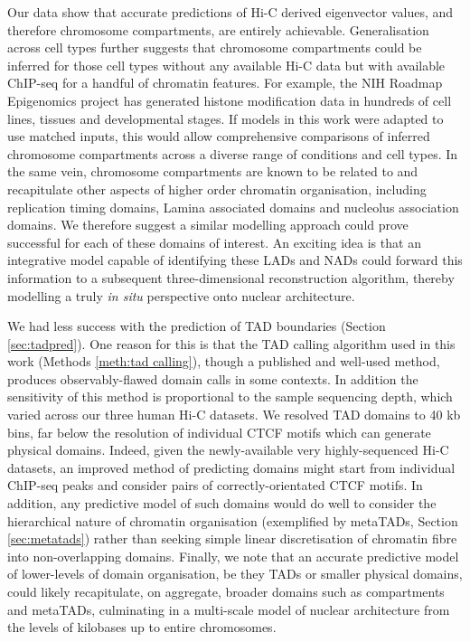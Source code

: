\documentclass[a4paper,11pt,oneside]{book}
\begin{document}
Our data show that accurate predictions of Hi-C derived
eigenvector values, and therefore chromosome compartments, are entirely achievable. Generalisation across cell types further suggests that chromosome compartments could be inferred for those cell types without any available Hi-C data but with available ChIP-seq for a handful of chromatin features. For example, the NIH Roadmap Epigenomics project has generated histone modification data in hundreds of cell lines, tissues and developmental stages.\cite{Bernstein2010, Kundaje2015} If models in this work were adapted to use matched inputs, this would allow comprehensive comparisons of inferred chromosome compartments across a diverse range of conditions and cell types. In the same vein, chromosome compartments are known to be related to and recapitulate other aspects of higher order chromatin organisation, including replication timing domains, Lamina associated domains and nucleolus association domains. We therefore suggest a similar modelling approach could prove successful for each of these domains of interest. An exciting idea is that an integrative model capable of identifying these LADs and NADs could forward this information to a subsequent three-dimensional reconstruction algorithm, thereby modelling a truly \emph{in situ} perspective onto nuclear architecture.

We had less success with the prediction of TAD boundaries (Section \ref{sec:tadpred}). One reason for this is that the TAD calling algorithm used in this work\cite{Dixon2012} (Methods \ref{meth:tad calling}), though a published and well-used method, produces observably-flawed domain calls in some contexts. In addition the sensitivity of this method is proportional to the sample sequencing depth, which varied across our three human Hi-C datasets. We resolved TAD domains to 40 kb bins, far below the resolution of individual CTCF motifs which can generate physical domains. Indeed, given the newly-available very highly-sequenced Hi-C datasets,\cite{Rao2014} an improved method of predicting domains might start from individual ChIP-seq peaks and consider pairs of correctly-orientated CTCF motifs. In addition, any predictive model of such domains would do well to consider the hierarchical nature of chromatin organisation (exemplified by metaTADs, Section \ref{sec:metatads}) rather than seeking simple linear discretisation of chromatin fibre into non-overlapping domains. Finally, we note that an accurate predictive model of lower-levels of domain organisation, be they TADs or smaller physical domains, could likely recapitulate, on aggregate, broader domains such as compartments and metaTADs, culminating in a multi-scale model of nuclear architecture from the levels of kilobases up to entire chromosomes.
\end{document}

